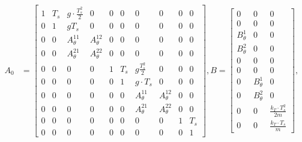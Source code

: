 \documentclass[../../thesis.tex]{subfiles}
\begin{document}
\begin{figure}[t]
\begin{equation}
\begin{aligned}
A_0 &= \begin{bmatrix} 1 & T_s &  g \cdot \frac {T_s^2} {2} & 0 		& 0 & 0 & 0 & 0 	& 0 &   0 \\
			      0 & 1 & g T_s & 0 				& 0 & 0 & 0 & 0 	& 0 &   0 \\
			      0 & 0 & A_\theta^{11} & A_\theta^{12} 			& 0 & 0 & 0 & 0 	& 0 &   0 \\
			      0 & 0 & A_\theta^{21} & A_\theta^{22}  			& 0 & 0 & 0 & 0 	& 0 &   0 \\
			      0 & 0 & 0 & 0 & 1 & T_s &  g\frac{T_s^2} {2} & 0	& 0 & 0 \\
			      0 & 0 & 0 & 0 & 0 & 1 & g \cdot T_s & 0  & 0 & 0 \\
			      0 & 0 & 0 & 0 & 0 & 0 &  A_\theta^{11} & A_\theta^{12} & 0 & 0 \\
			      0 & 0 & 0 & 0 & 0 & 0 &  A_\theta^{21} & A_\theta^{22}  & 0 & 0 \\
			      0 & 0 & 0 & 0 & 0 & 0 & 0 & 0 & 1 & T_s \\
			      0 & 0 & 0 & 0 & 0 & 0 & 0 & 0 & 0 & 1
	\end{bmatrix}, 
B = \begin{bmatrix}  
				0	& 	0	& 	0 \\
				0	& 	0	& 	0 \\
				B_\theta^1 & 0 & 0 \\
				B_\theta^2 & 0 & 0 \\
				0	& 	0	& 	0 \\
				0	& 	0	& 	0 \\
				0 &  B_\theta^1  & 0 \\
				0 &  B_\theta^2  & 0 \\
				0 & 0 & \frac {k_T \cdot T_s^2} {2m} \\
				0 & 0 & \frac {k_T \cdot T_s} {m}
	\end{bmatrix}, \\
\end{aligned}
\end{equation}
\end{figure}
\end{document}
